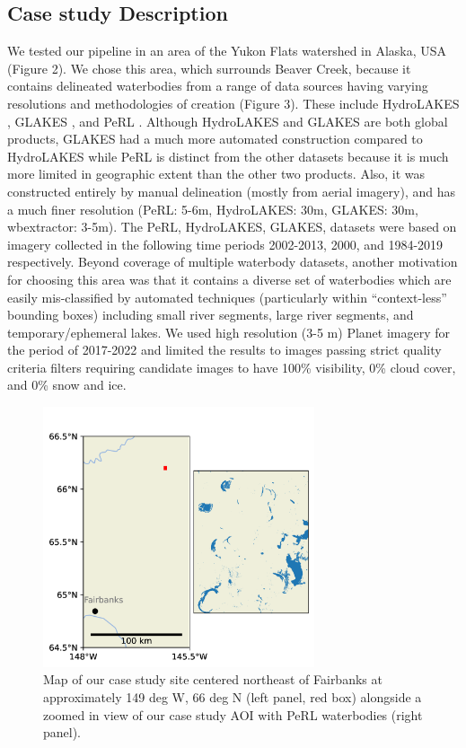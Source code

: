 \documentclass{article}
\begin{document}
\subsection{Case study Description}

We tested our pipeline in an area of the Yukon Flats watershed in Alaska, USA (Figure 2). We chose this area, which surrounds Beaver Creek, because it contains delineated waterbodies from a range of data sources having varying resolutions and methodologies of creation (Figure 3). These include HydroLAKES \citep{lehnerGlobalRiverHydrography2013}, GLAKES \citep{piMappingGlobalLake2022}, and PeRL \citep{musterPeRLCircumArcticPermafrost2017}. Although HydroLAKES and GLAKES are both global products, GLAKES had a much more automated construction compared to HydroLAKES while PeRL is distinct from the other datasets because it is much more limited in geographic extent than the other two products. Also, it was constructed entirely by manual delineation (mostly from aerial imagery), and has a much finer resolution (PeRL:  5-6m, HydroLAKES: 30m, GLAKES: 30m, wbextractor: 3-5m). The PeRL, HydroLAKES, GLAKES, datasets were based on imagery collected in the following time periods 2002-2013, 2000, and 1984-2019 respectively. Beyond coverage of multiple waterbody datasets, another motivation for choosing this area was that it contains a diverse set of waterbodies which are easily mis-classified by automated techniques (particularly within “context-less” bounding boxes) including small river segments, large river segments, and temporary/ephemeral lakes. We used high resolution (3-5 m) Planet imagery for the period of 2017-2022 and limited the results to images passing strict quality criteria filters requiring candidate images to have 100\% visibility, 0\% cloud cover, and 0\% snow and ice.

\begin{figure}
	\centering
	\includegraphics[width=8cm]{../figures/study_site}
	\caption{Map of our case study site centered northeast of Fairbanks at approximately 149 deg W, 66 deg N (left panel, red box) alongside a zoomed in view of our case study AOI with PeRL waterbodies (right panel).}
	\label{fig:study_site}
\end{figure}
\end{document}
